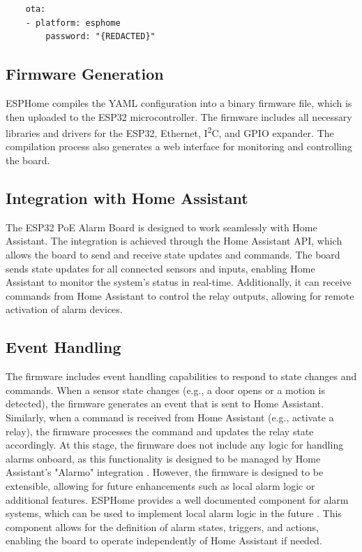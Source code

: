 \documentclass[a4paper,12pt]{article}
\begin{document}
\begin{lstlisting}
    ota:
    - platform: esphome
        password: "{REDACTED}"
\end{lstlisting}


\subsection{Firmware Generation}
ESPHome compiles the YAML configuration into a binary firmware file, which is then uploaded to the ESP32 microcontroller. The firmware includes all necessary libraries and drivers for the ESP32, Ethernet, I\textsuperscript{2}C, and GPIO expander. The compilation process also generates a web interface for monitoring and controlling the board.

\subsection{Integration with Home Assistant}
The ESP32 PoE Alarm Board is designed to work seamlessly with Home Assistant. The integration is achieved through the Home Assistant API, which allows the board to send and receive state updates and commands. 
The board sends state updates for all connected sensors and inputs, enabling Home Assistant to monitor the system's status in real-time. Additionally, it can receive commands from Home Assistant to control the relay outputs, allowing for remote activation of alarm devices.

\subsection{Event Handling}
The firmware includes event handling capabilities to respond to state changes and commands. When a sensor state changes (e.g., a door opens or a motion is detected), the firmware generates an event that is sent to Home Assistant. Similarly, when a command is received from Home Assistant (e.g., activate a relay), the firmware processes the command and updates the relay state accordingly.
At this stage, the firmware does not include any logic for handling alarms onboard, as this functionality is designed to be managed by Home Assistant's "Alarmo" integration \cite{faberNielsfaberAlarmo2025}. However, the firmware is designed to be extensible, allowing for future enhancements such as local alarm logic or additional features.
ESPHome provides a well documented component for alarm systems, which can be used to implement local alarm logic in the future \cite{AlarmControlPanel}. This component allows for the definition of alarm states, triggers, and actions, enabling the board to operate independently of Home Assistant if needed.
\end{document}
